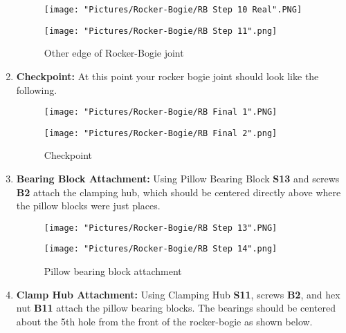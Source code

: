 \documentclass[12pt]{article}
\begin{document}
\begin{enumerate}
\begin{figure}[H]
  \centering
  \begin{minipage}[b]{0.45\textwidth}
    \texttt{[image: "Pictures/Rocker-Bogie/RB Step 10 Real".PNG]}
  \end{minipage}
  \hfill
  \begin{minipage}[b]{0.45\textwidth}
    \texttt{[image: "Pictures/Rocker-Bogie/RB Step 11".png]}
  \end{minipage}
  \caption{Other edge of Rocker-Bogie joint}
\end{figure}

\item \textbf{Checkpoint:} At this point your rocker bogie joint should look like the following. 

\begin{figure}[H]
  \centering
  \begin{minipage}[b]{0.45\textwidth}
    \texttt{[image: "Pictures/Rocker-Bogie/RB Final 1".PNG]}
  \end{minipage}
  \hfill
  \begin{minipage}[b]{0.45\textwidth}
    \texttt{[image: "Pictures/Rocker-Bogie/RB Final 2".png]}
  \end{minipage}
  \caption{Checkpoint}
\end{figure}

\item \textbf{Bearing Block Attachment: } Using Pillow Bearing Block \textbf{S13} and screws \textbf{B2} attach the clamping hub, which should be centered directly above where the pillow blocks were just places. 

\begin{figure}[H]
  \centering
  \begin{minipage}[b]{0.45\textwidth}
    \texttt{[image: "Pictures/Rocker-Bogie/RB Step 13".PNG]}
  \end{minipage}
  \hfill
  \begin{minipage}[b]{0.45\textwidth}
    \texttt{[image: "Pictures/Rocker-Bogie/RB Step 14".png]}
  \end{minipage}
  \caption{Pillow bearing block attachment}
\end{figure}

\item \textbf{Clamp Hub Attachment: } Using Clamping Hub \textbf{S11}, screws \textbf{B2}, and hex nut \textbf{B11} attach the pillow bearing blocks. The bearings should be centered about the 5th hole from the front of the rocker-bogie as shown below. 


\end{enumerate}
\end{document}
